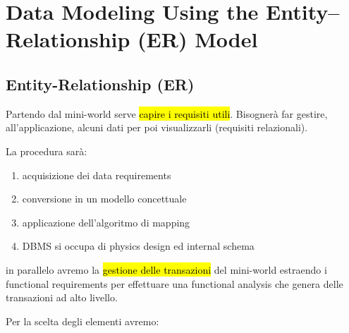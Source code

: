 \newpage
\section{Data Modeling Using the Entity–Relationship (ER) Model}


\subsection{Entity-Relationship (ER)}

Partendo dal mini-world serve \hl{capire i requisiti utili}. Bisognerà far gestire, all'applicazione, alcuni dati per poi visualizzarli (requisiti relazionali).

La procedura sarà:

\begin{enumerate}
	\item acquisizione dei data requirements
	\item conversione in un modello concettuale
	\item applicazione dell'algoritmo di mapping
	\item DBMS si occupa di physics design ed internal schema
\end{enumerate}

in parallelo avremo la \hl{gestione delle transazioni} del mini-world estraendo i functional requirements per effettuare una functional analysis che genera delle transazioni ad alto livello.


Per la scelta degli elementi avremo:

